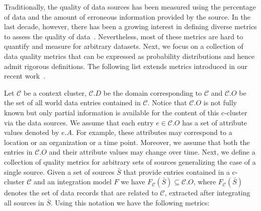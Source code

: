 \documentclass{sig-alternate}
\begin{document}
Traditionally, the quality of data sources has been measured using the percentage of data and the amount of erroneous information provided by the source. In the last decade, however, there has been a growing interest in defining diverse metrics to assess the quality of data~\cite{pipino:2002}. Nevertheless, most of these metrics are hard to quantify and measure for arbitrary datasets. Next, we focus on a collection of data quality metrics that can be expressed as probability distributions and hence admit rigorous definitions. The following list extends metrics introduced in our recent work~\cite{dong:vldb13, rekatsinas:2014}.

Let $\mathcal{C}$  be a context cluster,  $\mathcal{C}.D$ be the domain corresponding to $\mathcal{C}$ and $\mathcal{C}.O$ be the set of all world data entries contained in $\mathcal{C}$. Notice that $\mathcal{C}.O$ is not fully known but only partial information is available for the content of this c-cluster via the data sources. We assume that each entry $e \in \mathcal{C}.O$ has a set of attribute values denoted by $e.A$. For example, these attributes may correspond to a location or an organization or a time point. Moreover, we assume that both the entries in $\mathcal{C}.O$ and their attribute values may change over time. Next, we define a collection of quality metrics for arbitrary sets of sources generalizing the case of a single source. Given a set of sources $\bar{S}$ that provide entries contained in a c-cluster $\mathcal{C}$ and an integration model $F$ we have $F_{\mathcal{C}}(\bar{S}) \subseteq \mathcal{C}.O$, where $F_{\mathcal{C}}(\bar{S})$ denotes the set of data records that are related to $\mathcal{C}$, extracted after integrating all sources in $\bar{S}$. Using this notation we have the following metrics:

\end{document}
